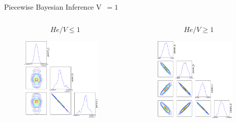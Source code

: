 \documentclass[10pt]{beamer}
\begin{document}
\begin{frame}{Piecewise Bayesian Inference V~$= 1$}
  	\begin{columns}[onlytextwith]
    	\begin{column}{0.43\textwidth}
    	$$He/V \leq 1$$
    	\vspace{1.2cm}
      		\begin{figure}
        		\includegraphics[width=0.9\textwidth]{low1Triangle}
      		\end{figure}
    	\end{column}  
    	\begin{column}{0.59\textwidth}
    	$$He/V \geq 1$$
      		\begin{figure}
        		\includegraphics[width=0.9\textwidth]{high1Triangle}
      		\end{figure}
    	\end{column}
  	\end{columns}
\end{frame}
\end{document}
